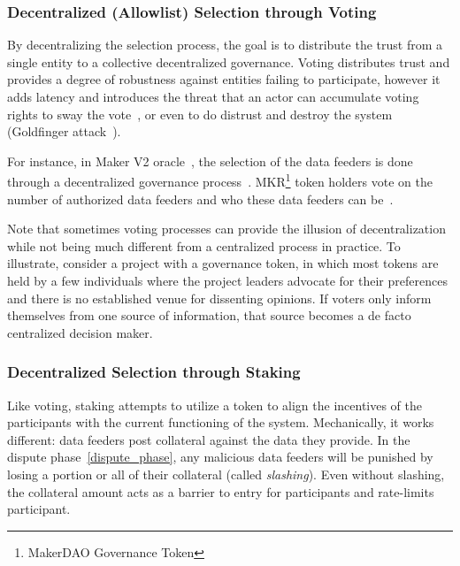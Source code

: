 \subsubsection{Decentralized (Allowlist) Selection through Voting} By decentralizing the selection process, the goal is to distribute the trust from a single entity to a collective decentralized governance.
Voting distributes trust and provides a degree of robustness against entities failing to participate, however it adds latency and introduces the threat that an actor can accumulate voting rights to sway the vote~\cite{makerdaoflashloanattack}, or even to do distrust and destroy the system (\eg Goldfinger attack~\cite{kroll2013economics}). 

For instance, in Maker V2 oracle~\cite{MAKERDAOOracle}, the selection of the data feeders is done through a decentralized governance process~\cite{gu2020empirical}. MKR\footnote{MakerDAO Governance Token} token holders vote on the number of authorized data feeders and who these data feeders can be~\cite{coinmonkMKRgovernance}. 


Note that sometimes voting processes can provide the illusion of decentralization while not being much different from a centralized process in practice. To illustrate, consider a project with a governance token, in which most tokens are held by a few individuals where the project leaders advocate for their preferences and there is no established venue for dissenting opinions. If voters only inform themselves from one source of information, that source becomes a de facto centralized decision maker. 

\subsubsection{Decentralized Selection through Staking} Like voting, staking attempts to utilize a token to align the incentives of the participants with the current functioning of the system. Mechanically, it works different: data feeders post collateral against the data they provide. In the dispute phase~\ref{dispute_phase}, any malicious data feeders will be punished by losing a portion or all of their collateral (called \textit{slashing}). Even without slashing, the collateral amount acts as a barrier to entry for participants and rate-limits participant.  

